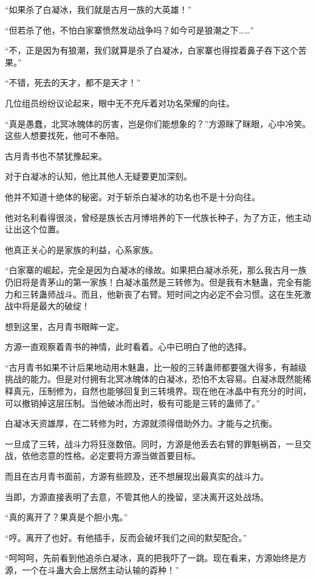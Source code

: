 \begin{this_body}
“如果杀了白凝冰，我们就是古月一族的大英雄！”

“但若杀了他，不怕白家寨愤然发动战争吗？如今可是狼潮之下……”

“不，正是因为有狼潮，我们就算是杀了白凝冰，白家寨也得捏着鼻子吞下这个苦果。”

“不错，死去的天才，都不是天才！”

几位组员纷纷议论起来，眼中无不充斥着对功名荣耀的向往。

“真是愚蠢，北冥冰魄体的厉害，岂是你们能想象的？”方源眯了眯眼，心中冷笑。这些人想要找死，他可不奉陪。

古月青书也不禁犹豫起来。

对于白凝冰的认知，他比其他人无疑要更加深刻。

他并不知道十绝体的秘密。对于斩杀白凝冰的功名也不是十分向往。

他对名利看得很淡，曾经是族长古月博培养的下一代族长种子，为了方正，他主动让出这个位置。

他真正关心的是家族的利益，心系家族。

“白家寨的崛起，完全是因为白凝冰的缘故。如果把白凝冰杀死，那么我古月一族仍旧将是青茅山的第一家族！白凝冰虽然是三转修为。但是我有木魅蛊，完全有能力和三转蛊师战斗。而且，他新丧了右臂。短时间之内必定不会习惯。这在生死激战中将是最大的破绽！

想到这里，古月青书眼眸一定。

方源一直观察着青书的神情，此时看着。心中已明白了他的选择。

“古月青书如果不计后果地动用木魅蛊，比一般的三转蛊师都要强大得多，有越级挑战的能力。但是对付拥有北冥冰魄体的白凝冰，恐怕不太容易。白凝冰既然能稀释真元，压制修为，自然也能够回复到三转境界。现在他在冰晶中有充分的时间，可以撤销掉这层压制。当他破冰而出时，极有可能是三转的蛊师了。”

白凝冰天资雄厚，在二转修为时，方源就须得借助外力。才能与之抗衡。

一旦成了三转，战斗力将狂涨数倍。同时，方源是他丢去右臂的罪魁祸首，一旦交战，依他恣意的性格。必定要将方源当做首要目标。

而且在古月青书面前，方源有些顾及，还不想展现出最真实的战斗力。

当即，方源直接表明了去意，不管其他人的挽留，坚决离开这处战场。

“真的离开了？果真是个胆小鬼。”

“哼。离开了也好。有他插手，反而会破坏我们之间的默契配合。”

“呵呵呵，先前看到他追杀白凝冰，真的把我吓了一跳。现在看来，方源始终是方源，一个在斗蛊大会上居然主动认输的孬种！”


\end{this_body}
